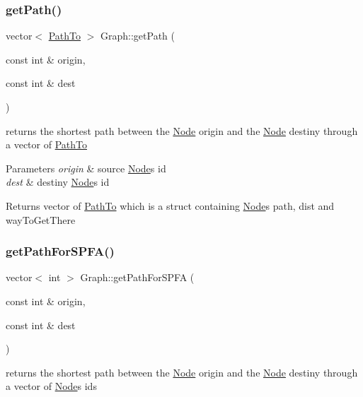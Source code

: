 \subsubsection{\texorpdfstring{get\+Path()}{getPath()}}
{\footnotesize\ttfamily vector$<$ \hyperlink{struct_path_to}{Path\+To} $>$ Graph\+::get\+Path (\begin{DoxyParamCaption}\item[{const int \&}]{origin,  }\item[{const int \&}]{dest }\end{DoxyParamCaption})}



returns the shortest path between the \hyperlink{class_node}{Node} origin and the \hyperlink{class_node}{Node} destiny through a vector of \hyperlink{struct_path_to}{Path\+To} 


\begin{DoxyParams}{Parameters}
{\em origin} & source \hyperlink{class_node}{Node}\textquotesingle{}s id \\
\hline
{\em dest} & destiny \hyperlink{class_node}{Node}\textquotesingle{}s id \\
\hline
\end{DoxyParams}
\begin{DoxyReturn}{Returns}
vector of \hyperlink{struct_path_to}{Path\+To} which is a struct containing \hyperlink{class_node}{Node}\textquotesingle{}s path, dist and way\+To\+Get\+There 
\end{DoxyReturn}
\mbox{\label{class_graph_a82d46b15dc3938a1f8b9baa465dda9d1}} 
\subsubsection{\texorpdfstring{get\+Path\+For\+S\+P\+F\+A()}{getPathForSPFA()}}
{\footnotesize\ttfamily vector$<$ int $>$ Graph\+::get\+Path\+For\+S\+P\+FA (\begin{DoxyParamCaption}\item[{const int \&}]{origin,  }\item[{const int \&}]{dest }\end{DoxyParamCaption})}



returns the shortest path between the \hyperlink{class_node}{Node} origin and the \hyperlink{class_node}{Node} destiny through a vector of \hyperlink{class_node}{Node}\textquotesingle{}s ids 


